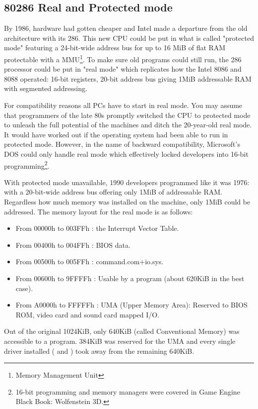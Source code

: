 \documentclass[book.tex]{subfiles}
\begin{document}
\subsection{80286 Real and Protected mode}
By 1986, hardware had gotten cheaper and Intel made a departure from the old architecture
with its 286. This new CPU could be put in what is called "protected mode" featuring
a 24-bit-wide address bus for up to 16 MiB of flat RAM protectable with a MMU\footnote{Memory Management Unit}. To make sure old programs could still run, the 286 processor could be put in "real mode" which replicates how the Intel 8086 and 8088 operated: 16-bit registers, 20-bit address bus giving 1MiB addressable RAM with segmented addressing.\\

\par
For compatibility reasons all PCs have to start in real mode. You may assume that programmers
of the late 80s promptly switched the CPU to protected mode to unleash the full
potential of the machines and ditch the 20-year-old real mode. It would have worked out if the operating system had been able to run in protected mode.
However, in the name of backward compatibility, Microsoft's DOS could only handle real
mode which effectively locked developers into 16-bit programming\footnote{16-bit programming and memory managers were covered in Game Engine Black Book: Wolfenstein 3D.}.\\


\par
  With protected mode unavailable, 1990 developers programmed like it was 1976: with a 20-bit-wide address bus offering only 1MiB of addressable RAM. Regardless how much memory was installed on the machine, only 1MiB could be addressed. The memory layout for the real mode is as follows:
\begin{itemize}
\item From 00000h to 003FFh : the Interrupt Vector Table.
\item From 00400h to 004FFh : BIOS data.
\item From 00500h to 005FFh : command.com+io.sys.
\item From 00600h to 9FFFFh : Usable by a program (about 620KiB in the best case). 
\item From A0000h to FFFFFh : UMA (Upper Memory Area): Reserved to BIOS ROM, video card and sound card mapped I/O.
\end{itemize}


\bigskip
Out of the original 1024KiB, only 640KiB (called Conventional Memory) was accessible to a program. 384KiB was reserved for the UMA and every single driver installed ( and ) took away from the remaining 640KiB.\\
\end{document}
